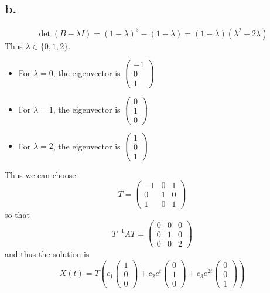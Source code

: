 \documentclass[11pt]{article}
\theoremstyle{mystyle}
\theoremstyle{definition}
\begin{document}
\subsection*{b.}
\[
  \det(B-\lambda I) = (1-\lambda)^3 - (1-\lambda) = (1-\lambda)(\lambda^2 -2\lambda)
\]
Thus $\lambda \in \{0,1,2\}$. \\
\begin{itemize}
  \item For $\lambda = 0$, the eigenvector is 
    $  
    \begin{pmatrix}
      -1 \\ 0 \\ 1 
    \end{pmatrix}
    $ 
  \item For $\lambda = 1$, the eigenvector is
    $  
    \begin{pmatrix}
      0 \\ 1 \\ 0 
    \end{pmatrix}
    $
  \item For $\lambda = 2$, the eigenvector is
    $  
    \begin{pmatrix}
      1 \\ 0 \\ 1 
    \end{pmatrix}
    $
\end{itemize}
Thus we can choose 
\[
  T = 
  \begin{pmatrix}
    -1 & 0 & 1 \\
    0 & 1 & 0 \\
    1 & 0 & 1
  \end{pmatrix}
\]
so that 
\[
  T^{-1}AT = 
  \begin{pmatrix}
    0 & 0 & 0 \\
    0 & 1 & 0 \\
    0 & 0 & 2
  \end{pmatrix}
\]
and thus the solution is 
\[
  X(t) = T \left(
  c_1  
  \begin{pmatrix}
    1 \\ 0 \\ 0
  \end{pmatrix}
  + c_2 e^t 
  \begin{pmatrix}
    0 \\ 1 \\ 0
  \end{pmatrix}
  + c_3 e^{2t}
  \begin{pmatrix}
    0 \\ 0 \\ 1
  \end{pmatrix}
  \right)
\]
\end{document}
